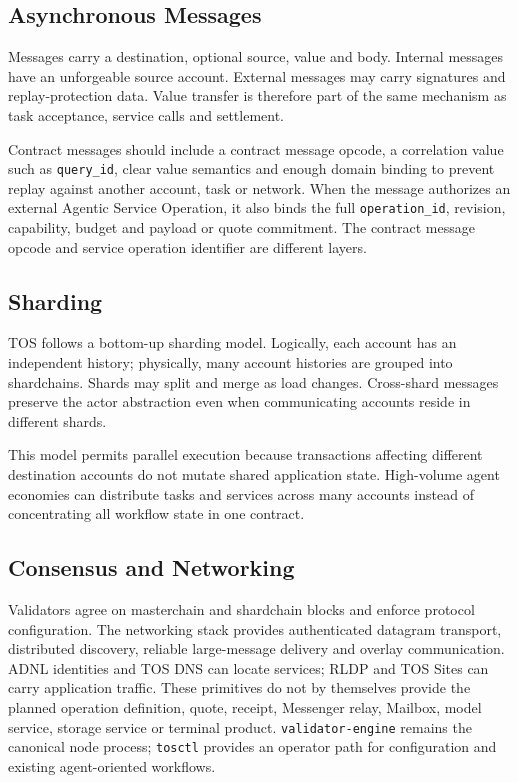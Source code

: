 \documentclass[11pt,oneside]{article}
\begin{document}
\subsection{Asynchronous Messages}

Messages carry a destination, optional source, value and body. Internal messages have an
unforgeable source account. External messages may carry signatures and replay-protection data.
Value transfer is therefore part of the same mechanism as task acceptance, service calls and
settlement.

Contract messages should include a contract message opcode, a correlation value such as
\texttt{query\_id}, clear value semantics and enough domain binding to prevent replay against
another account, task or network. When the message authorizes an external Agentic Service
Operation, it also binds the full \texttt{operation\_id}, revision, capability, budget and
payload or quote commitment. The contract message opcode and service operation identifier are
different layers.

\subsection{Sharding}

TOS follows a bottom-up sharding model. Logically, each account has an independent history;
physically, many account histories are grouped into shardchains. Shards may split and merge as
load changes. Cross-shard messages preserve the actor abstraction even when communicating
accounts reside in different shards.

This model permits parallel execution because transactions affecting different destination
accounts do not mutate shared application state. High-volume agent economies can distribute
tasks and services across many accounts instead of concentrating all workflow state in one
contract.

\subsection{Consensus and Networking}

Validators agree on masterchain and shardchain blocks and enforce protocol configuration.
The networking stack provides authenticated datagram transport, distributed discovery,
reliable large-message delivery and overlay communication. ADNL identities and TOS DNS can
locate services; RLDP and TOS Sites can carry application traffic. These primitives do not by themselves provide the planned operation definition, quote,
receipt, Messenger relay, Mailbox, model service, storage service or terminal product.
\texttt{validator-engine} remains the canonical node process; \texttt{tosctl} provides an
operator path for configuration and existing agent-oriented workflows.
\end{document}
